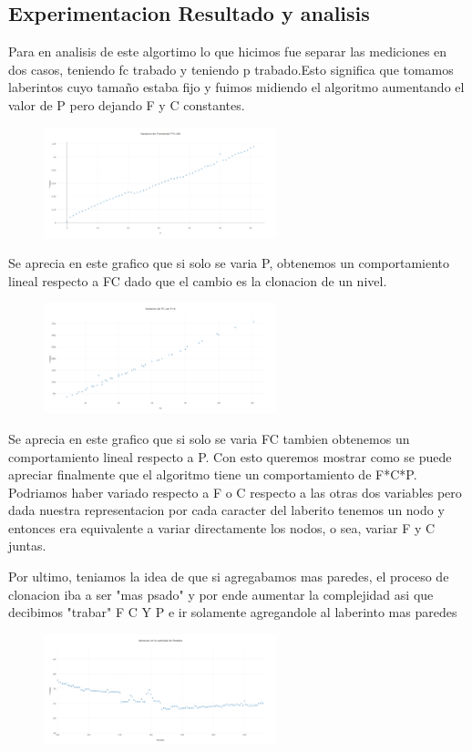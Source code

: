 \documentclass[spanish,12pt]{article}
\begin{document}
\subsection{Experimentacion Resultado y analisis }
Para en analisis de este algortimo lo que hicimos fue separar las mediciones en dos casos, teniendo fc trabado y teniendo p trabado.Esto significa que tomamos laberintos cuyo tamaño estaba fijo y fuimos midiendo el algoritmo
aumentando el valor de P pero dejando F y C constantes.


\begin{figure}[H]
\centering
\includegraphics     [width=0.6\textwidth]{fcfijo}
\caption{}
\end{figure}

Se aprecia en este grafico que si solo se varia P, obtenemos un comportamiento lineal respecto a FC dado que el cambio es la clonacion de un nivel.


\begin{figure}[H]
\centering
\includegraphics     [width=0.6\textwidth]{pfijo}
\caption{}
\end{figure}
Se aprecia en este grafico que si solo se varia FC tambien obtenemos un comportamiento lineal respecto a P.
Con esto queremos mostrar como se puede apreciar finalmente que el algoritmo tiene un comportamiento de F*C*P. Podriamos haber variado respecto a F o C respecto a las otras dos variables pero dada nuestra representacion
por cada caracter del laberito tenemos un nodo y entonces era equivalente a variar directamente los nodos, o sea, variar F y C juntas.





Por ultimo, teniamos la idea de que si agregabamos mas paredes, el proceso de clonacion iba a ser "mas psado" y por ende aumentar la complejidad asi que decibimos "trabar" F C Y P e ir solamente agregandole al laberinto mas paredes
\begin{figure}[H]
\centering
\includegraphics     [width=0.6\textwidth]{paredesfijas}
\caption{}
\end{figure}
\end{document}
